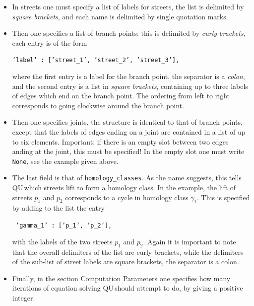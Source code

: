 \documentclass[11pt]{article}
\def\QU{{\sf QU}$\,$}
\begin{document}
\begin{itemize}

\item In {\sf streets} one must specify a list of labels for streets, the list is delimited by \emph{square brackets}, and each name is delimited by single quotation marks. 

\smallskip

\item Then one specifies a list of {\sf branch points}: this is delimited by \emph{curly brackets}, each entry is of the form

 \hspace*{10pt} {\texttt{'label' : ['street\_1', 'street\_2', 'street\_3'],}}
 
 where the first entry is a label for the branch point, the separator is a \emph{colon}, and the second entry is a list in \emph{square brackets}, containing up to three labels of edges which end on the branch point. The ordering from left to right corresponds to going clockwise around the branch point.
 
 \smallskip
 
\item  Then one specifies {\sf joints}, the structure is identical to that of branch points, except that the labels of edges ending on a joint are contained in a list of up to six elements. {Important:} if there is an empty slot between two edges anding at the joint, this must be specified! In the empty slot one must write {\texttt{None}}, see the example given above.

\smallskip

\item The last field is that of {\texttt{homology\_classes}}. As the name suggests, this tells \QU which streets lift to form a homology class. 
In the example, the lift of streets $p_1$ and $p_2$ corresponds to a cycle in homology class $\gamma_1$. This is specified by adding to the list the entry

\noindent\texttt{ \hspace*{10pt} 'gamma\_1' : ['p\_1', 'p\_2'],}

with the labels of the two streets $p_1$ and $p_2$. Again it is important to note that the overall delimiters of the list are curly brackets, while the delimiters of the sub-list of street labels are square brackets, the separator is a colon.

\smallskip

\item Finally, in the section {\sf Computation Parameters} one specifies how many iterations of equation solving \QU should attempt to do, by giving a positive integer.
\end{itemize}
\end{document}
